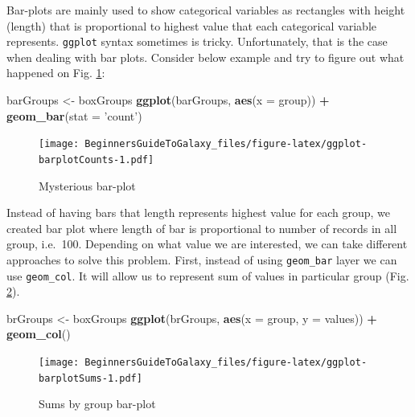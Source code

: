 \documentclass[]{book}
\newenvironment{Shaded}{\begin{snugshade}}{\end{snugshade}}
\newcommand{\KeywordTok}[1]{\textcolor[rgb]{0.13,0.29,0.53}{\textbf{#1}}}
\newcommand{\DataTypeTok}[1]{\textcolor[rgb]{0.13,0.29,0.53}{#1}}
\newcommand{\StringTok}[1]{\textcolor[rgb]{0.31,0.60,0.02}{#1}}
\newcommand{\OperatorTok}[1]{\textcolor[rgb]{0.81,0.36,0.00}{\textbf{#1}}}
\newcommand{\NormalTok}[1]{#1}
\theoremstyle{definition}
\theoremstyle{definition}
\theoremstyle{definition}
\theoremstyle{remark}
\begin{document}
Bar-plots are mainly used to show categorical variables as rectangles
with height (length) that is proportional to highest value that each
categorical variable represents. \texttt{ggplot} syntax sometimes is
tricky. Unfortunately, that is the case when dealing with bar plots.
Consider below example and try to figure out what happened on Fig.
\ref{fig:ggplot-barplotCounts}:

\begin{Shaded}
\begin{Highlighting}[]
\NormalTok{barGroups <-}\StringTok{ }\NormalTok{boxGroups}
\KeywordTok{ggplot}\NormalTok{(barGroups, }\KeywordTok{aes}\NormalTok{(}\DataTypeTok{x =}\NormalTok{ group)) }\OperatorTok{+}
\StringTok{  }\KeywordTok{geom_bar}\NormalTok{(}\DataTypeTok{stat =} \StringTok{'count'}\NormalTok{)}
\end{Highlighting}
\end{Shaded}

\begin{figure}
\centering
\texttt{[image: BeginnersGuideToGalaxy\_files/figure-latex/ggplot-barplotCounts-1.pdf]}
\caption{\label{fig:ggplot-barplotCounts}Mysterious bar-plot}
\end{figure}

Instead of having bars that length represents highest value for each
group, we created bar plot where length of bar is proportional to number
of records in all group, i.e.~100. Depending on what value we are
interested, we can take different approaches to solve this problem.
First, instead of using \texttt{geom\_bar} layer we can use
\texttt{geom\_col}. It will allow us to represent sum of values in
particular group (Fig. \ref{fig:ggplot-barplotSums}).

\begin{Shaded}
\begin{Highlighting}[]
\NormalTok{brGroups <-}\StringTok{ }\NormalTok{boxGroups}
\KeywordTok{ggplot}\NormalTok{(brGroups, }\KeywordTok{aes}\NormalTok{(}\DataTypeTok{x =}\NormalTok{ group, }\DataTypeTok{y =}\NormalTok{ values)) }\OperatorTok{+}
\StringTok{  }\KeywordTok{geom_col}\NormalTok{()}
\end{Highlighting}
\end{Shaded}

\begin{figure}
\centering
\texttt{[image: BeginnersGuideToGalaxy\_files/figure-latex/ggplot-barplotSums-1.pdf]}
\caption{\label{fig:ggplot-barplotSums}Sums by group bar-plot}
\end{figure}
\end{document}
